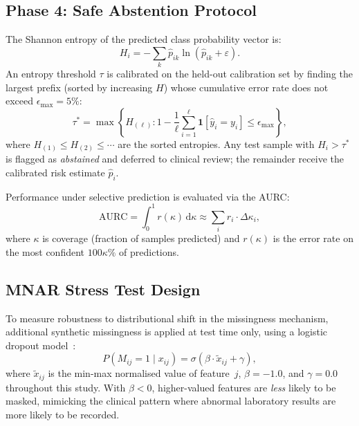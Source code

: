 \documentclass[a4paper,fleqn,longmktitle]{cas-sc}
\begin{document}
	\subsection{Phase 4: Safe Abstention Protocol}
	\label{sec:phase4}
	
	The Shannon entropy of the predicted class probability vector is:
	\begin{equation}
		H_i = -\sum_{k} \hat{p}_{ik} \ln(\hat{p}_{ik} + \varepsilon).
		\label{eq:entropy}
	\end{equation}
	An entropy threshold $\tau$ is calibrated on the held-out
	calibration set by finding the largest prefix (sorted by
	increasing $H$) whose cumulative error rate does not exceed
	$\epsilon_{\max} = 5\%$:
	\begin{equation}
		\tau^* = \max\!\left\{
		H_{(\ell)} :
		1 - \frac{1}{\ell}\sum_{i=1}^{\ell} \mathbf{1}[\hat{y}_i = y_i]
		\le \epsilon_{\max}
		\right\},
		\label{eq:tau_calibration}
	\end{equation}
	where $H_{(1)} \le H_{(2)} \le \cdots$ are the sorted entropies.
	Any test sample with $H_i > \tau^*$ is flagged as \emph{abstained}
	and deferred to clinical review; the remainder receive the
	calibrated risk estimate $\hat{p}_i$.
	
	Performance under selective prediction is evaluated via the AURC:
	\begin{equation}
		\text{AURC} = \int_0^1 r(\kappa)\, \mathrm{d}\kappa
		\approx \sum_{i} r_i \cdot \Delta\kappa_i,
		\label{eq:aurc}
	\end{equation}
	where $\kappa$ is coverage (fraction of samples predicted)
	and $r(\kappa)$ is the error rate on the most confident
	$100\kappa\%$ of predictions.
	
	\subsection{MNAR Stress Test Design}
	\label{sec:mnar_stress}
	
	To measure robustness to distributional shift in the missingness
	mechanism, additional synthetic missingness is applied at test time
	only, using a logistic dropout model~\citep{sterne2009multiple,
		josse2019consistency}:
	\begin{equation}
		P(M_{ij} = 1 \mid x_{ij}) =
		\sigma\!\left(\beta \cdot \tilde{x}_{ij} + \gamma\right),
		\label{eq:mnar_mask}
	\end{equation}
	where $\tilde{x}_{ij}$ is the min-max normalised value of feature~$j$,
	$\beta = -1.0$, and $\gamma = 0.0$ throughout this study.
	With $\beta < 0$, higher-valued features are \emph{less} likely to
	be masked, mimicking the clinical pattern where abnormal laboratory
	results are more likely to be recorded.
	
\end{document}

